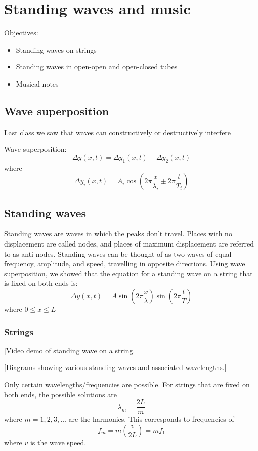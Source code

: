 \section{Standing waves and music}
Objectives:
\begin{itemize}
\item Standing waves on strings
\item Standing waves in open-open and open-closed tubes
\item Musical notes  
\end{itemize}

\subsection{Wave superposition}
Last class we saw that waves can constructively or destructively interfere

 Wave superposition:
$$\Delta y(x,t)=\Delta y_1(x,t)+\Delta y_2(x,t)$$
where
  $$\Delta y_i(x,t)=A_i\cos\left(2\pi\frac{x}{\lambda_i}\pm 2\pi\frac{t}{T_i}\right)$$

\subsection{Standing waves}  
Standing waves are waves in which the peaks don't travel. Places with no displacement are called nodes, and places of maximum displacement are referred to as anti-nodes. Standing waves can be thought of as two waves of equal frequency, amplitude, and speed, travelling in opposite directions. Using wave superposition, we showed that the equation for a standing wave on a string that is fixed on both ends is:
$$\Delta y(x,t)=A\sin\left(2\pi\frac{x}{\lambda}\right)\sin\left(2\pi\frac{t}{T}\right)$$
where $0\leq x \leq L$

\subsubsection{Strings}

[Video demo of standing wave on a string.]

[Diagrams showing various standing waves and associated wavelengths.]\nopagebreak
\vspace{8cm}

Only certain wavelengths/frequencies are possible. For strings that are fixed on both ends, the possible solutions are
  $$\lambda_m=\frac{2L}{m}$$
  where $m=1,2,3,\dots$ are the harmonics. This corresponds to frequencies of
  $$f_m=m\left(\frac{v}{2L}\right)=mf_1$$
  where $v$ is the wave speed.


